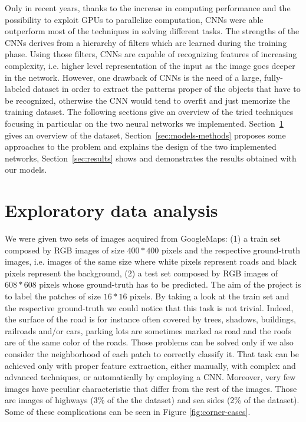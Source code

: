 \documentclass[10pt,conference,compsocconf]{IEEEtran}
\begin{document}
Only in recent years, thanks to the increase in computing performance and the possibility to exploit GPUs to parallelize computation, CNNs were able outperform most of the techniques in solving different tasks. The strengths of the CNNs derives from a hierarchy of filters which are learned during the training phase. Using those filters, CNNs are capable of recognizing features of increasing complexity, i.e. higher level representation of the input as the image goes deeper in the network. However, one drawback of CNNs is the need of a large, fully-labeled dataset in order to extract the patterns proper of the objects that have to be recognized, otherwise the CNN would tend to overfit and just memorize the training dataset.
The following sections give an overview of the tried techniques focusing in particular on the two neural networks we implemented. Section~\ref{sec:data-analysis} gives an overview of the dataset, Section~\ref{sec:models-methods} proposes some approaches to the problem and explains the design of the two implemented networks, Section~\ref{sec:results} shows and demonstrates the results obtained with our models.

\section{Exploratory data analysis}
\label{sec:data-analysis}
We were given two sets of images acquired from GoogleMaps: (1) a train set composed by RGB images of size $400*400$ pixels and the respective ground-truth images, i.e. images of the same size where white pixels represent roads and black pixels represent the background, (2) a test set composed by RGB images of $608*608$ pixels whose ground-truth has to be predicted.
The aim of the project is to label the patches of size $16*16$ pixels. By taking a look at the train set and the respective ground-truth we could notice that this task is not trivial. Indeed, the surface of the road is for instance often covered by trees, shadows, buildings, railroads and/or cars, parking lots are sometimes marked as road and the roofs are of the same color of the roads. Those problems can be solved only if we also consider the neighborhood of each patch to correctly classify it. That task can be achieved only with proper feature extraction, either manually, with complex and advanced techniques, or automatically by employing a CNN. Moreover, very few images have peculiar characteristic that differ from the rest of the images. Those are images of highways (3\% of the the dataset) and sea sides (2\% of the dataset). Some of these complications can be seen in Figure \ref{fig:corner-cases}.
\end{document}
